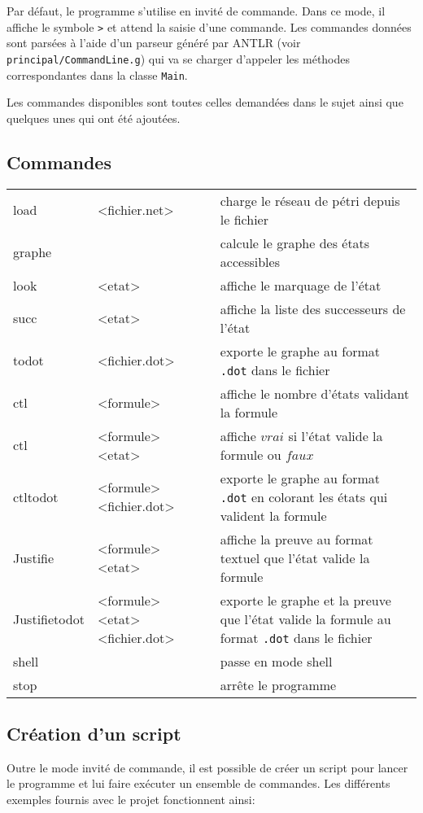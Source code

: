 \documentclass[dvipsnames]{report}
\begin{document}
Par défaut, le programme s'utilise en invité de commande. Dans ce mode, il affiche le symbole \texttt{>} et attend la saisie d'une commande. Les commandes données sont parsées à l'aide d'un parseur généré par ANTLR (voir \texttt{principal/CommandLine.g}) qui va se charger d'appeler les méthodes correspondantes dans la classe \texttt{Main}.

Les commandes disponibles sont toutes celles demandées dans le sujet ainsi que quelques unes qui ont été ajoutées.

\subsection{Commandes}

\noindent\begin{tabularx}{\linewidth}{@{}l l X@{}}
load & <fichier.net> & charge le réseau de pétri depuis le fichier \\
graphe & & calcule le graphe des états accessibles \\
look & <etat> & affiche le marquage de l'état \\
succ & <etat> & affiche la liste des successeurs de l'état \\
todot & <fichier.dot> & exporte le graphe au format \texttt{.dot} dans le fichier \\
ctl & <formule> & affiche le nombre d'états validant la formule \\
ctl & <formule> <etat> & affiche $vrai$ si l'état valide la formule ou $faux$ \\
ctltodot & <formule> <fichier.dot> & exporte le graphe au format \texttt{.dot} en colorant les états qui valident la formule \\
Justifie & <formule> <etat> & affiche la preuve au format textuel que l'état valide la formule \\
Justifietodot & <formule> <etat> <fichier.dot> & exporte le graphe et la preuve que l'état valide la formule au format \texttt{.dot} dans le fichier \\
shell & & passe en mode shell \\
stop & & arrête le programme \\
\end{tabularx}

\subsection{Création d'un script}

Outre le mode invité de commande, il est possible de créer un script pour lancer le programme et lui faire exécuter un ensemble de commandes. Les différents exemples fournis avec le projet fonctionnent ainsi:\\
\end{document}
